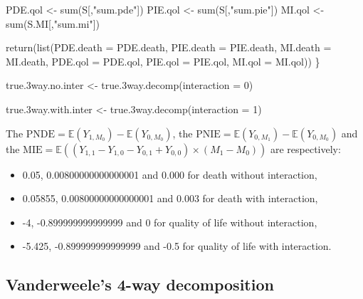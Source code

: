\documentclass[
]{book}
\newenvironment{Shaded}{\begin{snugshade}}{\end{snugshade}}
\newcommand{\AttributeTok}[1]{\textcolor[rgb]{0.77,0.63,0.00}{#1}}
\newcommand{\DecValTok}[1]{\textcolor[rgb]{0.00,0.00,0.81}{#1}}
\newcommand{\FloatTok}[1]{\textcolor[rgb]{0.00,0.00,0.81}{#1}}
\newcommand{\FunctionTok}[1]{\textcolor[rgb]{0.00,0.00,0.00}{#1}}
\newcommand{\NormalTok}[1]{#1}
\newcommand{\OtherTok}[1]{\textcolor[rgb]{0.56,0.35,0.01}{#1}}
\newcommand{\StringTok}[1]{\textcolor[rgb]{0.31,0.60,0.02}{#1}}
\providecommand{\tightlist}{%
  \setlength{\itemsep}{0pt}\setlength{\parskip}{0pt}}
\begin{document}
\begin{Shaded}
\begin{Highlighting}[]
\NormalTok{  PDE.qol }\OtherTok{\textless{}{-}} \FunctionTok{sum}\NormalTok{(S[,}\StringTok{"sum.pde"}\NormalTok{])}
\NormalTok{  PIE.qol }\OtherTok{\textless{}{-}} \FunctionTok{sum}\NormalTok{(S[,}\StringTok{"sum.pie"}\NormalTok{])}
\NormalTok{  MI.qol }\OtherTok{\textless{}{-}} \FunctionTok{sum}\NormalTok{(S.MI[,}\StringTok{"sum.mi"}\NormalTok{])}
  
  \FunctionTok{return}\NormalTok{(}\FunctionTok{list}\NormalTok{(}\AttributeTok{PDE.death =}\NormalTok{ PDE.death, }\AttributeTok{PIE.death =}\NormalTok{ PIE.death, }\AttributeTok{MI.death =}\NormalTok{ MI.death,}
              \AttributeTok{PDE.qol =}\NormalTok{ PDE.qol, }\AttributeTok{PIE.qol =}\NormalTok{ PIE.qol, }\AttributeTok{MI.qol =}\NormalTok{ MI.qol))}
\NormalTok{\}}
\end{Highlighting}
\end{Shaded}

\begin{Shaded}
\begin{Highlighting}[]
\NormalTok{true}\FloatTok{.3}\NormalTok{way.no.inter }\OtherTok{\textless{}{-}} \FunctionTok{true.3way.decomp}\NormalTok{(}\AttributeTok{interaction =} \DecValTok{0}\NormalTok{)}

\NormalTok{true}\FloatTok{.3}\NormalTok{way.with.inter }\OtherTok{\textless{}{-}} \FunctionTok{true.3way.decomp}\NormalTok{(}\AttributeTok{interaction =} \DecValTok{1}\NormalTok{)}
\end{Highlighting}
\end{Shaded}

The \(\text{PNDE}=\mathbb{E}\left( Y_{1,M_0}\right) - \mathbb{E}\left( Y_{0,M_0}\right)\), the \(\text{PNIE}=\mathbb{E}\left(Y_{0,M_1}\right) - \mathbb{E}\left(Y_{0,M_0}\right)\) and the \(\text{MIE}=\mathbb{E}\left( (Y_{1,1} - Y_{1,0} - Y_{0,1} + Y_{0,0}) \times (M_1 - M_0) \right)\) are respectively:

\begin{itemize}
\tightlist
\item
  0.05, 0.00800000000000001 and 0.000 for death without interaction,
\item
  0.05855, 0.00800000000000001 and 0.003 for death with interaction,
\item
  -4, -0.899999999999999 and 0 for quality of life without interaction,
\item
  -5.425, -0.899999999999999 and -0.5 for quality of life with interaction.
\end{itemize}

\hypertarget{vanderweeles-4-way-decomposition}{%
\subsection{Vanderweele's 4-way decomposition}\label{vanderweeles-4-way-decomposition}}
\end{document}
